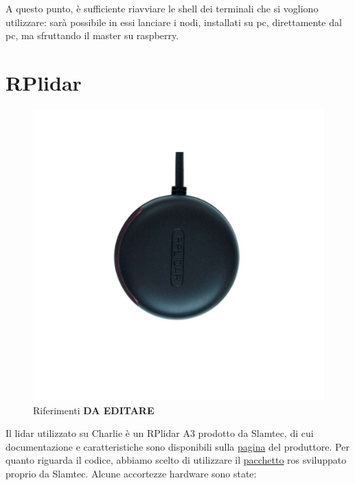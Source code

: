A questo punto, è sufficiente riavviare le shell dei terminali che si vogliono utilizzare: sarà possibile in essi lanciare i nodi, installati su pc, direttamente dal pc, ma sfruttando il master su raspberry.

\section{RPlidar}
\begin{figure}[] 
	\centering    
	\includegraphics[height=.2\textheight]{rplidar_axis.pdf}
	\caption{Riferimenti  \textbf{DA EDITARE}}
	\label{fig: rplidar axis}
\end{figure}

Il lidar utilizzato su Charlie è un RPlidar A3 prodotto da Slamtec, di cui documentazione e caratteristiche sono disponibili sulla \href{https://www.slamtec.com/en/Lidar/A3}{pagina} del produttore.
Per quanto riguarda il codice, abbiamo scelto di utilizzare il \href{https://wiki.ros.org/rplidar}{pacchetto} ros sviluppato proprio da Slamtec. 
Alcune accortezze hardware sono state:

